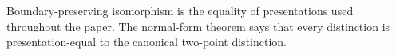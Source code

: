 \documentclass[11pt]{article}
\begin{document}
\begin{code}
\AgdaSpace{}%
\AgdaSpace{}%
\AgdaSymbol{(}\AgdaSpace{}%
\AgdaSpace{}%
\AgdaSymbol{)}\AgdaSpace{}%
\AgdaSpace{}%
\<%
\\
\>[0]\AgdaSpace{}%
\AgdaSpace{}%
\AgdaSpace{}%
\AgdaSymbol{=}\AgdaSpace{}%
\AgdaSpace{}%
\<%
\\
\>[0]\AgdaSpace{}%
\AgdaSpace{}%
\AgdaSpace{}%
\AgdaSymbol{=}\AgdaSpace{}%
\AgdaSpace{}%
\<%
\end{code}

Boundary-preserving isomorphism is the equality of presentations used
throughout the paper.  The normal-form theorem says that every
distinction is presentation-equal to the canonical two-point
distinction.
\end{document}
